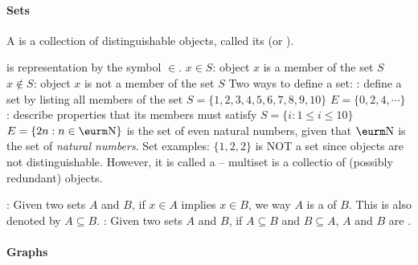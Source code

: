 \documentclass{myart}
\begin{document}



\paragraph{Sets}
\bit
\w A  is a collection of distinguishable objects, called its
 (or ). 

\w {} is representation by the symbol $\in$. 
  \bit
  \w $x \in S$: object $x$ is a member of the set $S$
  \w $x \not\in S$: object $x$ is not a member of the set $S$
  \eit
\w Two ways to define a set:
  \bit
  \w {}: define a set by listing all members of the set
    \bit
    \w $S = \{1, 2, 3, 4, 5, 6, 7, 8, 9, 10\}$
    \w $E = \{0, 2, 4, \cdots\}$
    \eit
  \w {}: 
        describe properties that its members must satisfy
    \bit
    \w $S = \{i : 1 \le  i \le 10\}$
    \w $E = \{2n : n \in \N\}$ is the set of even natural numbers, given that 
      $\N$ is the set of {\em natural numbers}.
    \eit
\w Set examples:
   \bit
   \w $\{1, 2, 2\}$ is NOT a set since objects are not
   distinguishable. However, it is called a  -- multiset is a
   collectio of (possibly redundant) objects.
   \eit

\w {}: 
   Given two sets $A$ and $B$, if $x \in A$ implies $x \in B$, 
   we way $A$ is a  of $B$.
  \bit
  \w This is also denoted by $A \subseteq B$.
  \eit
\w {}: Given two sets $A$ and $B$, if $A \subseteq B$ and $B
\subseteq A$,  
   $A$ and $B$ are . 

\w {}
  \bit

  \eit
\eit

\paragraph{Graphs}
\end{document}
